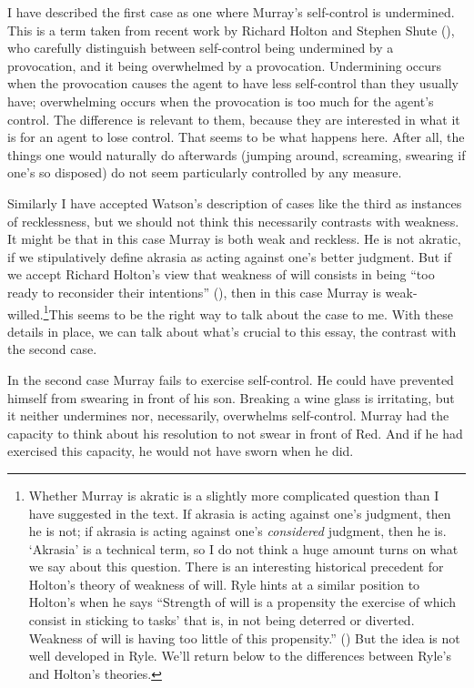 \documentclass[
  11pt,
  letterpaper,
  DIV=11,
  numbers=noendperiod,
  twoside]{scrartcl}
\begin{document}
I have described the first case as one where Murray's self-control is
undermined. This is a term taken from recent work by Richard Holton and
Stephen Shute (), who carefully
distinguish between self-control being undermined by a provocation, and
it being overwhelmed by a provocation. Undermining occurs when the
provocation causes the agent to have less self-control than they usually
have; overwhelming occurs when the provocation is too much for the
agent's control. The difference is relevant to them, because they are
interested in what it is for an agent to lose control. That seems to be
what happens here. After all, the things one would naturally do
afterwards (jumping around, screaming, swearing if one's so disposed) do
not seem particularly controlled by any measure.

Similarly I have accepted Watson's description of cases like the third
as instances of recklessness, but we should not think this necessarily
contrasts with weakness. It might be that in this case Murray is both
weak and reckless. He is not akratic, if we stipulatively define akrasia
as acting against one's better judgment. But if we accept Richard
Holton's view that weakness of will consists in being ``too ready to
reconsider their intentions'' (), then in this case Murray is weak-willed.\footnote{Whether Murray
  is akratic is a slightly more complicated question than I have
  suggested in the text. If akrasia is acting against one's judgment,
  then he is not; if akrasia is acting against one's \emph{considered}
  judgment, then he is. `Akrasia' is a technical term, so I do not think
  a huge amount turns on what we say about this question. There is an
  interesting historical precedent for Holton's theory of weakness of
  will. Ryle hints at a similar position to Holton's when he says
  ``Strength of will is a propensity the exercise of which consist in
  sticking to tasks' that is, in not being deterred or diverted.
  Weakness of will is having too little of this propensity.''
  () But the idea is not well developed
  in Ryle. We'll return below to the differences between Ryle's and
  Holton's theories.}This seems to be the right way to talk about the
case to me. With these details in place, we can talk about what's
crucial to this essay, the contrast with the second case.

In the second case Murray fails to exercise self-control. He could have
prevented himself from swearing in front of his son. Breaking a wine
glass is irritating, but it neither undermines nor, necessarily,
overwhelms self-control. Murray had the capacity to think about his
resolution to not swear in front of Red. And if he had exercised this
capacity, he would not have sworn when he did.
\end{document}
